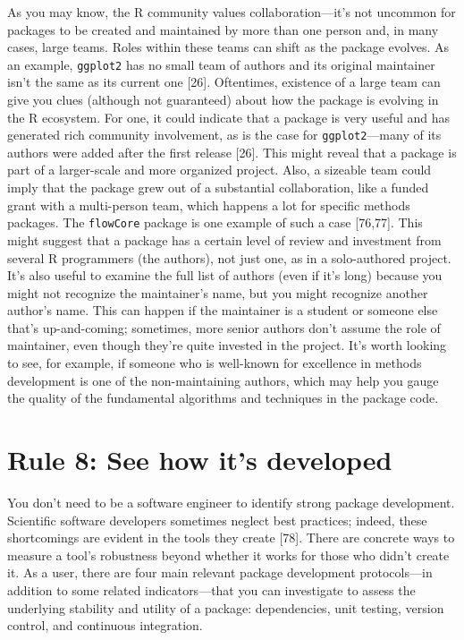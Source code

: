 \documentclass[10pt,letterpaper]{article}
\begin{document}
As you may know, the R community values collaboration---it's not
uncommon for packages to be created and maintained by more than one
person and, in many cases, large teams. Roles within these teams can
shift as the package evolves. As an example, \texttt{ggplot2} has no
small team of authors and its original maintainer isn't the same as its
current one {[}26{]}. Oftentimes, existence of a large team can give you
clues (although not guaranteed) about how the package is evolving in the
R ecosystem. For one, it could indicate that a package is very useful
and has generated rich community involvement, as is the case for
\texttt{ggplot2}---many of its authors were added after the first
release {[}26{]}. This might reveal that a package is part of a
larger-scale and more organized project. Also, a sizeable team could
imply that the package grew out of a substantial collaboration, like a
funded grant with a multi-person team, which happens a lot for specific
methods packages. The \texttt{flowCore} package is one example of such a
case {[}76,77{]}. This might suggest that a package has a certain level
of review and investment from several R programmers (the authors), not
just one, as in a solo-authored project. It's also useful to examine the
full list of authors (even if it's long) because you might not recognize
the maintainer's name, but you might recognize another author's name.
This can happen if the maintainer is a student or someone else that's
up-and-coming; sometimes, more senior authors don't assume the role of
maintainer, even though they're quite invested in the project. It's
worth looking to see, for example, if someone who is well-known for
excellence in methods development is one of the non-maintaining authors,
which may help you gauge the quality of the fundamental algorithms and
techniques in the package code.

\hypertarget{rule-8-see-how-its-developed}{%
\section{Rule 8: See how it's
developed}\label{rule-8-see-how-its-developed}}

You don't need to be a software engineer to identify strong package
development. Scientific software developers sometimes neglect best
practices; indeed, these shortcomings are evident in the tools they
create {[}78{]}. There are concrete ways to measure a tool's robustness
beyond whether it works for those who didn't create it. As a user, there
are four main relevant package development protocols---in addition to
some related indicators---that you can investigate to assess the
underlying stability and utility of a package: dependencies, unit
testing, version control, and continuous integration.
\end{document}
